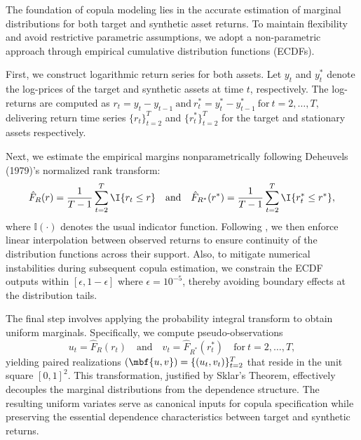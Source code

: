
The foundation of copula modeling lies in the accurate estimation of marginal distributions for both target and synthetic asset returns. To maintain flexibility and avoid restrictive parametric assumptions, we adopt a non-parametric approach through empirical cumulative distribution functions (ECDFs).

First, we construct logarithmic return series for both assets. Let $y_t$ and $y_t^*$ denote the log-prices of the target and synthetic assets at time $t$, respectively. The log-returns are computed as  
$
r_t = y_t - y_{t-1} 
~\text{and}~ 
r_t^* = y_t^* - y_{t-1}^* 
~\text{for}\ t = 2,\ldots,T,
$  
delivering return time series $\{r_t\}_{t=2}^T$ and $\{r_t^*\}_{t=2}^T$ for the target and stationary assets respectively. 

Next, we estimate the empirical margins nonparametrically following Deheuvels (1979)'s normalized rank transform: 
$$
\hat{F}_{R}(r) = \frac{1}{T-1} \sum_{t=2}^T \I{r_t \leq r} \quad \text{and} \quad \hat{F}_{R^*}(r^*) = \frac{1}{T-1} \sum_{t=2}^T \I{r_t^* \leq r^*},
$$  
where $\mathbb{I}(\cdot)$ denotes the usual indicator function. Following \cite{hudsonthames2024}, we then enforce linear interpolation between observed returns to ensure continuity of the distribution functions across their support. Also, to mitigate numerical instabilities during subsequent copula estimation, we constrain the ECDF outputs within $[\epsilon, 1-\epsilon]$ where $\epsilon = 10^{-5}$, thereby avoiding boundary effects at the distribution tails.

The final step involves applying the probability integral transform to obtain uniform marginals. Specifically, we compute pseudo-observations  
$$
u_t = \hat{F}_R(r_t) \quad \text{and} \quad v_t = \hat{F}_{R^*}(r_t^*) \quad \text{for}\ t = 2,\ldots,T,
$$  
yielding paired realizations $(\mbf {u,v})=\{(u_t,v_t)\}_{t=2}^T$ that reside in the unit square $[0,1]^2$. This transformation, justified by Sklar's Theorem, effectively decouples the marginal distributions from the dependence structure. The resulting uniform variates serve as canonical inputs for copula specification while preserving the essential dependence characteristics between target and synthetic returns. 

